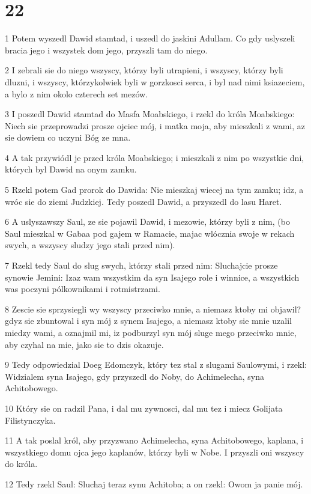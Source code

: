 \chapter{22}

\par 1 Potem wyszedl Dawid stamtad, i uszedl do jaskini Adullam. Co gdy uslyszeli bracia jego i wszystek dom jego, przyszli tam do niego.
\par 2 I zebrali sie do niego wszyscy, którzy byli utrapieni, i wszyscy, którzy byli dluzni, i wszyscy, którzykolwiek byli w gorzkosci serca, i byl nad nimi ksiazeciem, a bylo z nim okolo czterech set mezów.
\par 3 I poszedl Dawid stamtad do Masfa Moabskiego, i rzekl do króla Moabskiego: Niech sie przeprowadzi prosze ojciec mój, i matka moja, aby mieszkali z wami, az sie dowiem co uczyni Bóg ze mna.
\par 4 A tak przywiódl je przed króla Moabskiego; i mieszkali z nim po wszystkie dni, których byl Dawid na onym zamku.
\par 5 Rzekl potem Gad prorok do Dawida: Nie mieszkaj wiecej na tym zamku; idz, a wróc sie do ziemi Judzkiej. Tedy poszedl Dawid, a przyszedl do lasu Haret.
\par 6 A uslyszawszy Saul, ze sie pojawil Dawid, i mezowie, którzy byli z nim, (bo Saul mieszkal w Gabaa pod gajem w Ramacie, majac wlócznia swoje w rekach swych, a wszyscy sludzy jego stali przed nim).
\par 7 Rzekl tedy Saul do slug swych, którzy stali przed nim: Sluchajcie prosze synowie Jemini: Izaz wam wszystkim da syn Isajego role i winnice, a wszystkich was poczyni pólkownikami i rotmistrzami.
\par 8 Zescie sie sprzysiegli wy wszyscy przeciwko mnie, a niemasz ktoby mi objawil? gdyz sie zbuntowal i syn mój z synem Isajego, a niemasz ktoby sie mnie uzalil miedzy wami, a oznajmil mi, iz podburzyl syn mój sluge mego przeciwko mnie, aby czyhal na mie, jako sie to dzis okazuje.
\par 9 Tedy odpowiedzial Doeg Edomczyk, który tez stal z slugami Saulowymi, i rzekl: Widzialem syna Isajego, gdy przyszedl do Noby, do Achimelecha, syna Achitobowego.
\par 10 Który sie on radzil Pana, i dal mu zywnosci, dal mu tez i miecz Golijata Filistynczyka.
\par 11 A tak poslal król, aby przyzwano Achimelecha, syna Achitobowego, kaplana, i wszystkiego domu ojca jego kaplanów, którzy byli w Nobe. I przyszli oni wszyscy do króla.
\par 12 Tedy rzekl Saul: Sluchaj teraz synu Achitoba; a on rzekl: Owom ja panie mój.
